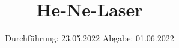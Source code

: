 

\subject{V61}
\title{He-Ne-Laser}
\date{%
  Durchführung: 23.05.2022
  \hspace{3em}
  Abgabe: 01.06.2022
}



\maketitle
\thispagestyle{empty}
\tableofcontents
\newpage






\printbibliography{}


